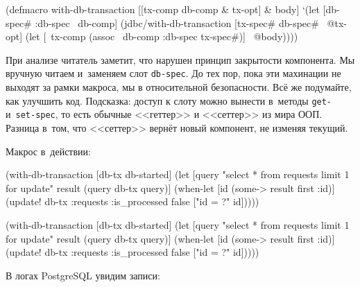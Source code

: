 \else

\begin{english}
  \begin{clojure}
(defmacro with-db-transaction
  [[tx-comp db-comp & tx-opt] & body]
  `(let [{db-spec# :db-spec} ~db-comp]
     (jdbc/with-db-transaction
       [tx-spec# db-spec# ~@tx-opt]
       (let [~tx-comp (assoc ~db-comp :db-spec tx-spec#)]
         ~@body))))
  \end{clojure}
\end{english}

\fi


При анализе читатель заметит, что нарушен принцип закрытости компонента. Мы
вручную читаем и~заменяем слот \verb|db-spec|. До тех пор, пока эти махинации не
выходят за рамки макроса, мы в относительной безопасности. Всё же подумайте, как
улучшить код. Подсказка: доступ к слоту можно вынести в~методы \verb|get-|
и~\verb|set-spec|, то есть обычные <<геттер>> и <<сеттер>> из мира ООП. Разница
в~том, что <<сеттер>> вернёт новый компонент, не изменяя текущий.

Макрос в~действии:

\ifnarrow

\begin{english}
  \begin{clojure}
(with-db-transaction
  [db-tx db-started]
  (let [query "select * from requests
               limit 1 for update"
        result (query db-tx query)]
    (when-let [id (some->
                    result first :id)]
      (update! db-tx :requests
               {:is_processed false}
               ["id = ?" id]))))
  \end{clojure}
\end{english}

\else

\begin{english}
  \begin{clojure}
(with-db-transaction
  [db-tx db-started]
  (let [query "select * from requests limit 1 for update"
        result (query db-tx query)]
    (when-let [id (some-> result first :id)]
      (update! db-tx :requests
               {:is_processed false}
               ["id = ?" id]))))
  \end{clojure}
\end{english}

\fi

\noindent
В логах PostgreSQL увидим записи:

